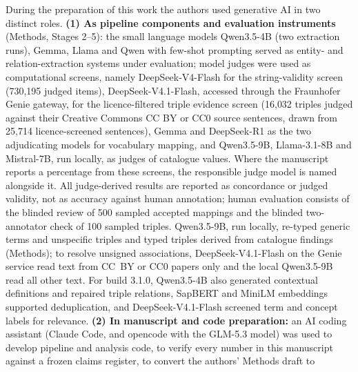 \documentclass[referee,lineno,pdflatex,sn-vancouver-num]{sn-jnl}
\theoremstyle{thmstyleone}%
\theoremstyle{thmstyletwo}%
\theoremstyle{thmstylethree}%
\begin{document}
During the preparation of this work the
authors used generative AI in two distinct roles.
\textbf{(1) As pipeline components and evaluation instruments} (Methods,
Stages 2--5): the small language models Qwen3.5-4B (two extraction runs),
Gemma, Llama and Qwen with few-shot prompting served as entity- and
relation-extraction systems under evaluation; model judges were used as
computational screens, namely DeepSeek-V4-Flash for the string-validity
screen (730{,}195 judged items), DeepSeek-V4.1-Flash, accessed through the
Fraunhofer Genie gateway, for the licence-filtered triple evidence screen
(16{,}032 triples judged against their Creative Commons CC BY or CC0 source
sentences, drawn from 25{,}714 licence-screened sentences), Gemma and
DeepSeek-R1 as the two adjudicating models for vocabulary mapping, and
Qwen3.5-9B, Llama-3.1-8B and Mistral-7B, run locally, as judges of
catalogue values. Where the
manuscript reports a percentage from these screens, the responsible judge
model is named alongside it. All judge-derived results are reported as
concordance or judged validity, not as accuracy against human annotation;
human evaluation consists of the blinded review of 500 sampled accepted
mappings and the blinded two-annotator check of 100 sampled triples. Qwen3.5-9B, run locally, re-typed generic terms and unspecific
triples and typed triples derived from catalogue findings (Methods); to
resolve unsigned associations, DeepSeek-V4.1-Flash on the Genie service
read text from CC~BY or CC0 papers only and the local Qwen3.5-9B read all
other text. For build 3.1.0, Qwen3.5-4B also generated contextual
definitions and repaired triple relations, SapBERT and MiniLM embeddings
supported deduplication, and DeepSeek-V4.1-Flash screened term and concept
labels for relevance.
\textbf{(2) In manuscript and code preparation:} an AI coding assistant
(Claude Code, and opencode with the GLM-5.3 model) was used to develop
pipeline and analysis code, to verify every number in this manuscript
against a frozen claims register, to convert the authors' Methods draft to
\end{document}
